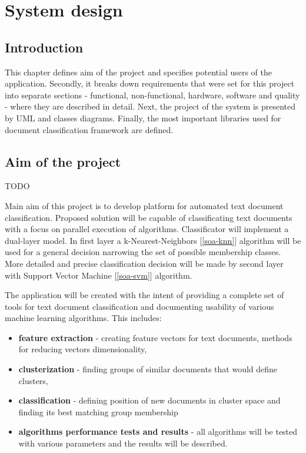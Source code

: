 \chapter{System design} \label{des}
\section{Introduction}
This chapter defines aim of the project and specifies potential users of the application. Secondly, it breaks down requirements that were set for this project into separate sections - functional, non-functional, hardware, software and quality -  where they are described in detail. Next, the project of the system is presented by UML and classes diagrams. Finally, the most important libraries used for document classification framework are defined.

\section{Aim of the project}
TODO

Main aim of this project is to develop platform for automated text document classification. Proposed solution will be capable of classificating text documents with a focus on parallel execution of algorithms. Classificator will implement a dual-layer model. In first layer a k-Nearest-Neighbors [\ref{soa-knn}] algorithm will be used for a general decision narrowing the set of possible membership classes. More detailed and precise classification decision will be made by second layer with Support Vector Machine [\ref{soa-svm}] algorithm.

The application will be created with the intent of providing a complete set of tools for text document classification and documenting usability of various machine learning algorithms. This includes:
\begin{itemize}
	\item \textbf{feature extraction} - creating feature vectors for text documents, methods for reducing vectors dimensionality,
	\item \textbf{clusterization} - finding groups of similar documents that would define clusters,
	\item \textbf{classification} - defining position of new documents in cluster space and finding its best matching group membership
	\item \textbf{algorithms performance tests and results} - all algorithms will be tested with various parameters and the results will be described.
\end{itemize}

